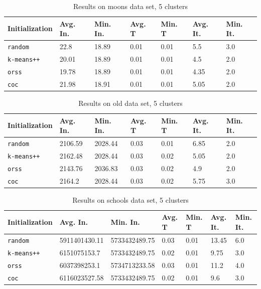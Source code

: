 \documentclass[12pt]{article}
\begin{document}
		\begin{table}[p]
			\begin{center}
				\begin{tabular}{|l|l|l|l|l|l|l|}
					\hline
					Initialization & Avg. In. & Min. In. & Avg. T & Min. T & Avg. It. & Min. It.\\\hline
					\texttt{random} & 22.8 & 18.89 & 0.01 & 0.01 & 5.5 & 3.0\\\hline
					\texttt{k-means++} & 20.01 & 18.89 & 0.01 & 0.01 & 4.5 & 2.0\\\hline
					\texttt{orss} & 19.78 & 18.89 & 0.01 & 0.01 & 4.35 & 2.0\\\hline
					\texttt{coc} & 21.98 & 18.91 & 0.01 & 0.01 & 5.05 & 2.0\\\hline
				\end{tabular}
				\caption{Results on moons data set, 5 clusters}
				\label{tbl:moons5}
			\end{center}
		\end{table}

		\begin{table}[p]
			\begin{center}
				\begin{tabular}{|l|l|l|l|l|l|l|}
					\hline
					Initialization & Avg. In. & Min. In. & Avg. T & Min. T & Avg. It. & Min. It.\\\hline
					\texttt{random} & 2106.59 & 2028.44 & 0.03 & 0.01 & 6.85 & 2.0\\\hline
					\texttt{k-means++} & 2162.48 & 2028.44 & 0.03 & 0.02 & 5.05 & 2.0\\\hline
					\texttt{orss} & 2143.76 & 2036.83 & 0.03 & 0.02 & 4.9 & 2.0\\\hline
					\texttt{coc} & 2164.2 & 2028.44 & 0.03 & 0.02 & 5.75 & 3.0\\\hline
				\end{tabular}
				\caption{Results on old data set, 5 clusters}
				\label{tbl:old5}
			\end{center}
		\end{table}

		\begin{table}[p]
			\begin{center}
				\begin{tabular}{|l|l|l|l|l|l|l|}
					\hline
					Initialization & Avg. In. & Min. In. & Avg. T & Min. T & Avg. It. & Min. It.\\\hline
					\texttt{random} & 5911401430.11 & 5733432489.75 & 0.03 & 0.01 & 13.45 & 6.0\\\hline
					\texttt{k-means++} & 6151075153.7 & 5733432489.75 & 0.02 & 0.01 & 9.75 & 3.0\\\hline
					\texttt{orss} & 6037398253.1 & 5734713233.58 & 0.03 & 0.01 & 11.2 & 4.0\\\hline
					\texttt{coc} & 6116023527.58 & 5733432489.75 & 0.02 & 0.01 & 9.6 & 3.0\\\hline
				\end{tabular}
				\caption{Results on schools data set, 5 clusters}
				\label{tbl:schools5}
			\end{center}
		\end{table}
\end{document}
